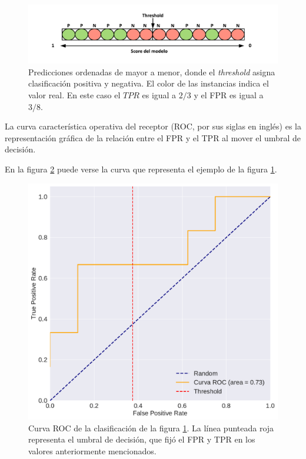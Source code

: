 \begin{itemize}
    \begin{figure}[H]
    \centering
        \includegraphics[scale=0.6]{documents/latex/figures/1/threshold_auc.pdf}
    \caption{Predicciones ordenadas de mayor a menor, donde el \textit{threshold} asigna clasificación positiva y negativa. El color de las instancias indica el valor real. En este caso el $TPR$ es igual a $2/3$ y el FPR es igual a $3/8$.}
    \label{fig:threshold_auc}
    \end{figure}
    
    La curva característica operativa del receptor (ROC, por sus siglas en inglés) es la representación gráfica de la relación entre el FPR y el TPR al mover el umbral de decisión. 

    En la figura \ref{fig:example_roc} puede verse la curva que representa el ejemplo de la figura \ref{fig:threshold_auc}.
    
    \begin{figure}[H]
        \centering
        \includegraphics[scale=0.4]{documents/latex/figures/1/roc_ejemplo.pdf}
        \caption{Curva ROC de la clasificación de la figura \ref{fig:threshold_auc}. La línea punteada roja representa el umbral de decisión, que fijó el FPR y TPR en los valores anteriormente mencionados.}
        \label{fig:example_roc}
    \end{figure}
    

\end{itemize}
